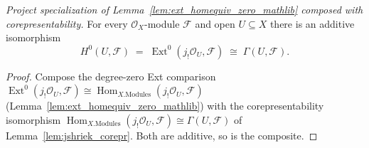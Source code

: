 \begin{lemma}\leanok
  \label{lem:absolute_cohomology_zero}
  \textit{Project specialization of Lemma~\ref{lem:ext_homequiv_zero_mathlib} composed with
  corepresentability.}
  For every \(\mathcal{O}_X\)-module \(\mathcal{F}\) and open \(U \subseteq X\) there is an additive
  isomorphism
  \[
    H^0(U, \mathcal{F}) \;=\; \operatorname{Ext}^0(j_!\mathcal{O}_U, \mathcal{F})
      \;\cong\; \Gamma(U, \mathcal{F}).
  \]
\end{lemma}
\begin{proof}
  \leanok
  Compose the degree-zero Ext comparison
  \(\operatorname{Ext}^0(j_!\mathcal{O}_U, \mathcal{F}) \cong
  \operatorname{Hom}_{X.\mathrm{Modules}}(j_!\mathcal{O}_U, \mathcal{F})\)
  (Lemma~\ref{lem:ext_homequiv_zero_mathlib}) with the corepresentability isomorphism
  \(\operatorname{Hom}_{X.\mathrm{Modules}}(j_!\mathcal{O}_U, \mathcal{F}) \cong \Gamma(U,
  \mathcal{F})\) of Lemma~\ref{lem:jshriek_corepr}. Both are additive, so is the composite.
\end{proof}

